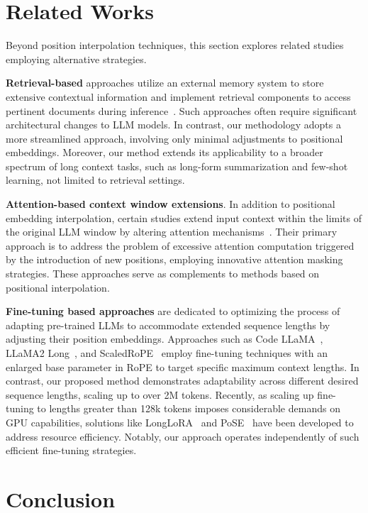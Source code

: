 \section{Related Works}

Beyond position interpolation techniques, this section explores related studies employing alternative strategies.

\textbf{Retrieval-based} approaches utilize an external memory system to store extensive contextual information and implement retrieval components to access pertinent documents during inference~\cite{longllama,wang2023augmenting,borgeaud2022improving}. Such approaches often require significant architectural changes to LLM models. In contrast, our methodology adopts a more streamlined approach, involving only minimal adjustments to positional embeddings. Moreover, our method extends its applicability to a broader spectrum of long context tasks, such as long-form summarization and few-shot learning, not limited to retrieval settings.

\textbf{Attention-based context window extensions}. In addition to positional embedding interpolation, certain studies extend input context within the limits of the original LLM window by altering attention mechanisms~\cite{han2023lminfinite, streamingllm,parallelwindow}. Their primary approach is to address the problem of excessive attention computation triggered by the introduction of new positions, employing innovative attention masking strategies. These approaches serve as complements to methods based on positional interpolation.

\textbf{Fine-tuning based approaches} are dedicated to optimizing the process of adapting pre-trained LLMs to accommodate extended sequence lengths by adjusting their position embeddings. Approaches such as Code LLaMA~\cite{codellama}, LLaMA2 Long~\cite{xiong2023effective}, and ScaledRoPE~\cite{liu2023scaling} employ fine-tuning techniques with an enlarged base parameter in RoPE to target specific maximum context lengths. In contrast, our proposed method demonstrates adaptability across different desired sequence lengths, scaling up to over 2M tokens. Recently, as scaling up fine-tuning to lengths greater than 128k tokens imposes considerable demands on GPU capabilities, solutions like LongLoRA~\cite{longlora} and PoSE~\cite{zhu2023pose} have been developed to address resource efficiency. Notably, our approach operates independently of such efficient fine-tuning strategies.

\section{Conclusion}


